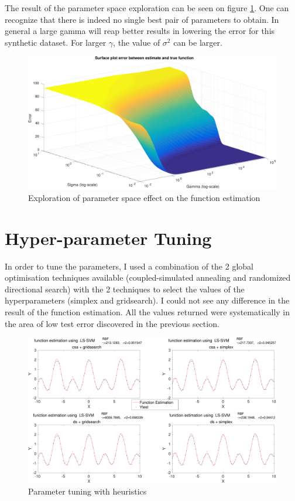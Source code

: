 \documentclass[11pt, a4paper]{article}
\begin{document}
The result of the parameter space exploration can be seen on figure
\ref{fig:sumcos_surf}. One can recognize that there is indeed no
single best pair of parameters to obtain. In general a large gamma
will reap better results in lowering the error for this synthetic
dataset. For larger $\gamma$, the value of $\sigma^2$ can be larger.

\begin{figure}[H]
    \centering
    \includegraphics[scale=.40]{sumcos_surf.pdf}
    \caption{Exploration of parameter space effect on the function estimation}
    \label{fig:sumcos_surf}
\end{figure}

\section{Hyper-parameter Tuning}

In order to tune the parameters, I used a combination of the 2 global
optimisation techniques available (coupled-simulated annealing and
randomized directional search) with the 2 techniques to select the
values of the hyperparameters (simplex and gridsearch). I could not
see any difference in the result of the function estimation. All the
values returned were systematically in the area of low test error
discovered in the previous section.

\begin{figure}[H]
    \centering
    \includegraphics[scale=.40]{hyperparam_tuning.pdf}
    \caption{Parameter tuning with heuristics}
    \label{fig:hyperparam_tuning}
\end{figure}
\end{document}
